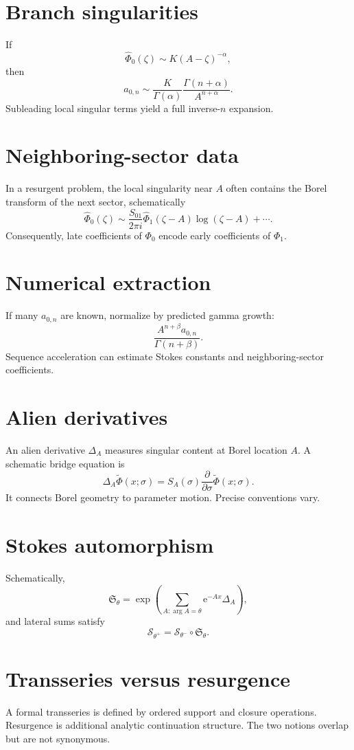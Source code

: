 \documentclass[11pt,oneside,openany]{book}
\newcommand{\e}{\mathrm{e}}
\newcommand{\compose}{\mathbin{\circ}}
\newcommand{\stokes}{\mathfrak{S}}
\newcommand{\alien}{\Delta}
\theoremstyle{plain}
\theoremstyle{definition}
\theoremstyle{remark}
\begin{document}
\section{Branch singularities}
If
\[
  \widehat\Phi_0(\zeta)
  \sim K(A-\zeta)^{-\alpha},
\]
then
\[
  a_{0,n}\sim
  \frac{K}{\Gamma(\alpha)}
  \frac{\Gamma(n+\alpha)}{A^{n+\alpha}}.
\]
Subleading local singular terms yield a full inverse-$n$ expansion.

\section{Neighboring-sector data}
In a resurgent problem, the local singularity near $A$ often contains the Borel transform of the next sector, schematically
\[
  \widehat\Phi_0(\zeta)
  \sim\frac{S_{01}}{2\pi i}
  \widehat\Phi_1(\zeta-A)\log(\zeta-A)+\cdots.
\]
Consequently, late coefficients of $\Phi_0$ encode early coefficients of $\Phi_1$.

\section{Numerical extraction}
If many $a_{0,n}$ are known, normalize by predicted gamma growth:
\[
  \frac{A^{n+\beta}a_{0,n}}{\Gamma(n+\beta)}.
\]
Sequence acceleration can estimate Stokes constants and neighboring-sector coefficients.

\section{Alien derivatives}
An alien derivative $\alien_A$ measures singular content at Borel location $A$. A schematic bridge equation is
\[
  \alien_A\widetilde\Phi(x;\sigma)
  =S_A(\sigma)\frac{\partial}{\partial\sigma}
  \widetilde\Phi(x;\sigma).
\]
It connects Borel geometry to parameter motion. Precise conventions vary.

\section{Stokes automorphism}
Schematically,
\[
  \stokes_\theta
  =\exp\left(
  \sum_{A:\arg A=\theta}\e^{-Ax}\alien_A
  \right),
\]
and lateral sums satisfy
\[
  \mathcal S_{\theta^+}
  =\mathcal S_{\theta^-}\compose\stokes_\theta.
\]

\section{Transseries versus resurgence}
A formal transseries is defined by ordered support and closure operations. Resurgence is additional analytic continuation structure. The two notions overlap but are not synonymous.
\end{document}
